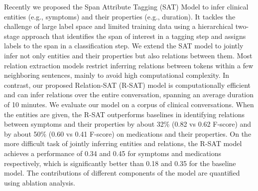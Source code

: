 Recently we proposed the Span Attribute Tagging (SAT) Model to infer clinical entities (e.g., symptoms) and their properties (e.g., duration). It tackles the challenge of large label space and limited training data using a hierarchical two-stage approach that identifies the span of interest in a tagging step and assigns labels to the span in a classification step. We extend the SAT model to jointly infer not only entities and their properties but also relations between them. Most relation extraction models restrict inferring relations between tokens within a few neighboring sentences, mainly to avoid high computational complexity. In contrast, our proposed Relation-SAT (R-SAT) model is computationally efficient and can infer relations over the entire conversation, spanning an average duration of 10 minutes. We evaluate our model on a corpus of clinical conversations. When the entities are given, the R-SAT outperforms baselines in identifying relations between symptoms and their properties by about 32\% (0.82 vs 0.62 F-score) and by about 50\% (0.60 vs 0.41 F-score) on medications and their properties. On the more difficult task of jointly inferring entities and relations, the R-SAT model achieves a performance of 0.34 and 0.45 for symptoms and medications respectively, which is significantly better than 0.18 and 0.35 for the baseline model. The contributions of different components of the model are quantified using ablation analysis.
